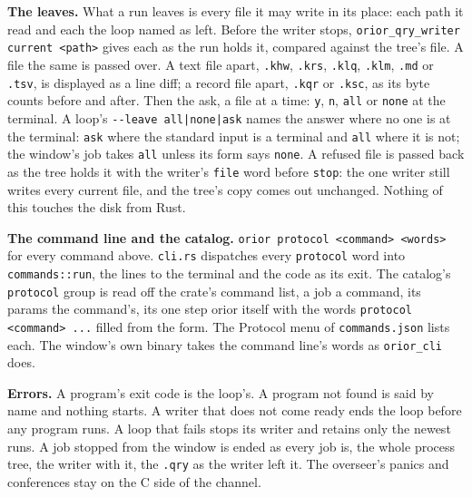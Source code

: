 \textbf{The leaves.} What a run leaves is every file it may write in its place: each path it read and each the loop named as left. Before the writer stops, \texttt{orior\_\allowbreak{}qry\_\allowbreak{}writer current <path>} gives each as the run holds it, compared against the tree's file. A file the same is passed over. A text file apart, \texttt{.\allowbreak{}khw}, \texttt{.\allowbreak{}krs}, \texttt{.\allowbreak{}klq}, \texttt{.\allowbreak{}klm}, \texttt{.\allowbreak{}md} or \texttt{.\allowbreak{}tsv}, is displayed as a line diff; a record file apart, \texttt{.\allowbreak{}kqr} or \texttt{.\allowbreak{}ksc}, as its byte counts before and after. Then the ask, a file at a time: \texttt{y}, \texttt{n}, \texttt{all} or \texttt{none} at the terminal. A loop's \texttt{-\allowbreak{}-\allowbreak{}leave all|none|ask} names the answer where no one is at the terminal: \texttt{ask} where the standard input is a terminal and \texttt{all} where it is not; the window's job takes \texttt{all} unless its form says \texttt{none}. A refused file is passed back as the tree holds it with the writer's \texttt{file} word before \texttt{stop}: the one writer still writes every current file, and the tree's copy comes out unchanged. Nothing of this touches the disk from Rust.

\textbf{The command line and the catalog.} \texttt{orior protocol <command> <words>} for every command above. \texttt{cli.\allowbreak{}rs} dispatches every \texttt{protocol} word into \texttt{commands::run}, the lines to the terminal and the code as its exit. The catalog's \texttt{protocol} group is read off the crate's command list, a job a command, its params the command's, its one step orior itself with the words \texttt{protocol <command> .\allowbreak{}.\allowbreak{}.\allowbreak{}} filled from the form. The Protocol menu of \texttt{commands.\allowbreak{}json} lists each. The window's own binary takes the command line's words as \texttt{orior\_\allowbreak{}cli} does.

\textbf{Errors.} A program's exit code is the loop's. A program not found is said by name and nothing starts. A writer that does not come ready ends the loop before any program runs. A loop that fails stops its writer and retains only the newest runs. A job stopped from the window is ended as every job is, the whole process tree, the writer with it, the \texttt{.\allowbreak{}qry} as the writer left it. The overseer's panics and conferences stay on the C side of the channel.

